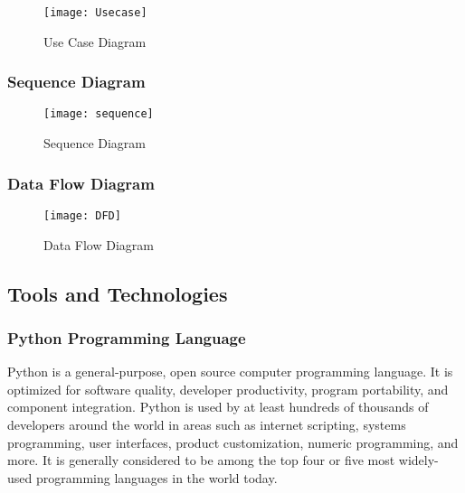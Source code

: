 \begin{figure}[H]
	\begin{center}
		
		\texttt{[image: Usecase]}
		\caption{Use Case Diagram}
	\end{center}
\end{figure}
\subsubsection{Sequence Diagram}
\begin{figure}[H]
	\begin{center}
		
		\texttt{[image: sequence]}
		\caption{Sequence Diagram}
	\end{center}
\end{figure}

\subsubsection{Data Flow Diagram}
\begin{figure}[H]
	\begin{center}
		
		\texttt{[image: DFD]}
		\caption{Data Flow Diagram}
	\end{center}
\end{figure}
\subsection{Tools and Technologies}
\subsubsection{Python Programming Language}
Python is a general-purpose, open source computer programming language. It is optimized for software quality, developer productivity, program portability, and component integration. Python is used by at least hundreds of thousands of developers around the world in areas such as internet scripting, systems programming, user interfaces, product customization, numeric programming, and more. It is generally considered to be among the top four or five most widely-used programming languages in the world today.

